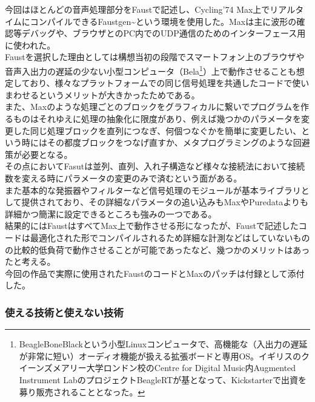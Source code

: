\documentclass[a4paper,report]{jsbook}
\begin{document}
今回はほとんどの音声処理部分をFaustで記述し、Cycling'74
Max上でリアルタイムにコンパイルできるFaustgen\textasciitilde{}という環境を使用した。Maxは主に波形の確認等デバッグや、ブラウザとのPC内でのUDP通信のためのインターフェース用に使われた。\\
Faustを選択した理由としては構想当初の段階でスマートフォン上のブラウザや音声入出力の遅延の少ない小型コンピュータ（Bela\footnote{BeagleBoneBlackという小型Linuxコンピュータで、高機能な（入出力の遅延が非常に短い）オーディオ機能が扱える拡張ボードと専用OS。イギリスのクイーンズメアリー大学ロンドン校のCentre
  for Digital Music内Augmented Instrument
  LabのプロジェクトBeagleRTが基となって、Kickstarterで出資を募り販売されることとなった\autocite{andrew2015a}。}）上で動作させることも想定しており、様々なプラットフォームでの同じ信号処理を共通したコードで使いまわせるというメリットが大きかったためである。\\
また、Maxのような処理ごとのブロックをグラフィカルに繋いでプログラムを作るものはそれゆえに処理の抽象化に限度があり、例えば幾つかのパラメータを変更した同じ処理ブロックを直列につなぎ、何個つなぐかを簡単に変更したい、という時にはその都度ブロックをつなげ直すか、メタプログラミングのような回避策が必要となる。\\
その点においてFasutは並列、直列、入れ子構造など様々な接続法において接続数を変える時にパラメータの変更のみで済むという面がある。\\
また基本的な発振器やフィルターなど信号処理のモジュールが基本ライブラリとして提供されており、その詳細なパラメータの追い込みもMaxやPuredataよりも詳細かつ簡潔に設定できるところも強みの一つである。\autocites[
]{Orlarey2004faust}{smith2012signal}\\
結果的にはFaustはすべてMax上で動作させる形になったが、Faustで記述したコードは最適化された形でコンパイルされるため詳細な計測などはしていないものの比較的低負荷で動作させることが可能であったなど、幾つかのメリットはあったと考える。\\
今回の作品で実際に使用されたFaustのコードとMaxのパッチは付録として添付した。

\subsubsection{使える技術と使えない技術}\label{ux4f7fux3048ux308bux6280ux8853ux3068ux4f7fux3048ux306aux3044ux6280ux8853}
\end{document}
